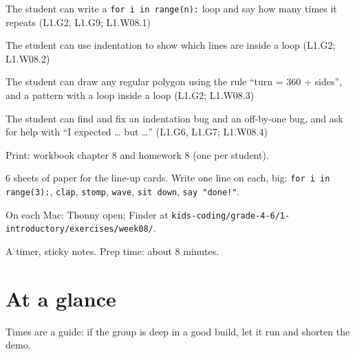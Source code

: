 
\begin{objectives}
  \item The student can write a \texttt{for i in range(n):} loop and say how many times it repeats (L1.G2, L1.G9; L1.W08.1)
  \item The student can use indentation to show which lines are inside a loop (L1.G2; L1.W08.2)
  \item The student can draw any regular polygon using the rule \enquote{turn = 360 ÷ sides}, and a pattern with a loop inside a loop (L1.G2; L1.W08.3)
  \item The student can find and fix an indentation bug and an off-by-one bug, and ask for help with \enquote{I expected … but …} (L1.G6, L1.G7; L1.W08.4)
\end{objectives}

\begin{materials}
  \item Print: workbook chapter 8 and homework 8 (one per student).
  \item 6 sheets of paper for the line-up cards. Write one line on each, big: \texttt{for i in range(3):}, \texttt{clap}, \texttt{stomp}, \texttt{wave}, \texttt{sit down}, \texttt{say "done!"}.
  \item On each Mac: Thonny open; Finder at \texttt{kids-coding/grade-4-6/1-introductory/exercises/week08/}.
  \item A timer, sticky notes. Prep time: about 8 minutes.
\end{materials}

\section{At a glance}
Times are a guide: if the group is deep in a good build, let it run and shorten the demo.
\begin{timeplan}
\end{timeplan}

